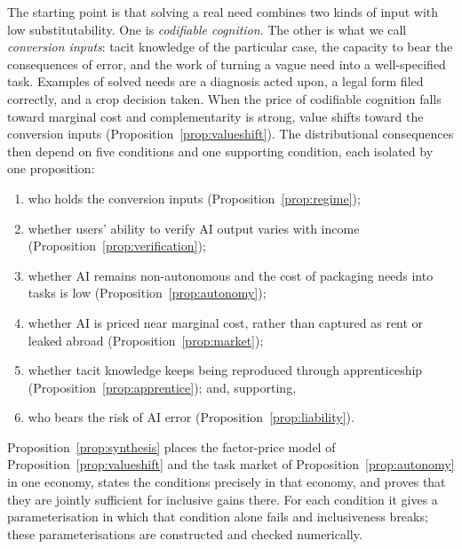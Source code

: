 \documentclass[12pt]{article}
\theoremstyle{remark}
\begin{document}
The starting point is that solving a real need combines two kinds of input with low substitutability. One is \emph{codifiable cognition}. The other is what we call \emph{conversion inputs}: tacit knowledge of the particular case, the capacity to bear the consequences of error, and the work of turning a vague need into a well-specified task. Examples of solved needs are a diagnosis acted upon, a legal form filed correctly, and a crop decision taken. When the price of codifiable cognition falls toward marginal cost and complementarity is strong, value shifts toward the conversion inputs (Proposition~\ref{prop:valueshift}). The distributional consequences then depend on five conditions and one supporting condition, each isolated by one proposition:
\begin{enumerate}[label=(\arabic*),leftmargin=2em,itemsep=0pt]
\item who holds the conversion inputs (Proposition~\ref{prop:regime});
\item whether users' ability to verify AI output varies with income (Proposition~\ref{prop:verification});
\item whether AI remains non-autonomous and the cost of packaging needs into tasks is low (Proposition~\ref{prop:autonomy});
\item whether AI is priced near marginal cost, rather than captured as rent or leaked abroad (Proposition~\ref{prop:market});
\item whether tacit knowledge keeps being reproduced through apprenticeship (Proposition~\ref{prop:apprentice}); and, supporting,
\item who bears the risk of AI error (Proposition~\ref{prop:liability}).
\end{enumerate}
Proposition~\ref{prop:synthesis} places the factor-price model of Proposition~\ref{prop:valueshift} and the task market of Proposition~\ref{prop:autonomy} in one economy, states the conditions precisely in that economy, and proves that they are jointly sufficient for inclusive gains there. For each condition it gives a parameterisation in which that condition alone fails and inclusiveness breaks; these parameterisations are constructed and checked numerically.
\end{document}
